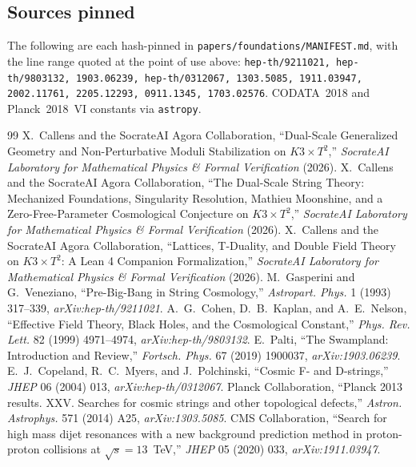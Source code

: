 \documentclass[11pt,a4paper]{article}
\theoremstyle{remark}
\begin{document}
\subsection{Sources pinned}
The following are each hash-pinned in \texttt{papers/foundations/MANIFEST.md}, with the line
range quoted at the point of use above:
{\small\texttt{hep-th/9211021, hep-th/9803132, 1903.06239, hep-th/0312067, 1303.5085,
1911.03947, 2002.11761, 2205.12293, 0911.1345, 1703.02576}}.
CODATA~2018 and Planck~2018~VI constants via \texttt{astropy}.

\begin{thebibliography}{99}
 X.~Callens and the SocrateAI Agora Collaboration, ``Dual-Scale Generalized Geometry and Non-Perturbative Moduli Stabilization on $K3\times T^2$,'' \textit{SocrateAI Laboratory for Mathematical Physics \& Formal Verification} (2026).
 X.~Callens and the SocrateAI Agora Collaboration, ``The Dual-Scale String Theory: Mechanized Foundations, Singularity Resolution, Mathieu Moonshine, and a Zero-Free-Parameter Cosmological Conjecture on $K3\times T^2$,'' \textit{SocrateAI Laboratory for Mathematical Physics \& Formal Verification} (2026).
 X.~Callens and the SocrateAI Agora Collaboration, ``Lattices, T-Duality, and Double Field Theory on $K3\times T^2$: A Lean 4 Companion Formalization,'' \textit{SocrateAI Laboratory for Mathematical Physics \& Formal Verification} (2026).
 M.~Gasperini and G.~Veneziano, ``Pre-Big-Bang in String Cosmology,'' \textit{Astropart. Phys.} 1 (1993) 317--339, \textit{arXiv:hep-th/9211021}.
 A.~G.~Cohen, D.~B.~Kaplan, and A.~E.~Nelson, ``Effective Field Theory, Black Holes, and the Cosmological Constant,'' \textit{Phys. Rev. Lett.} 82 (1999) 4971--4974, \textit{arXiv:hep-th/9803132}.
 E.~Palti, ``The Swampland: Introduction and Review,'' \textit{Fortsch. Phys.} 67 (2019) 1900037, \textit{arXiv:1903.06239}.
 E.~J.~Copeland, R.~C.~Myers, and J.~Polchinski, ``Cosmic F- and D-strings,'' \textit{JHEP} 06 (2004) 013, \textit{arXiv:hep-th/0312067}.
 Planck Collaboration, ``Planck 2013 results. XXV. Searches for cosmic strings and other topological defects,'' \textit{Astron. Astrophys.} 571 (2014) A25, \textit{arXiv:1303.5085}.
 CMS Collaboration, ``Search for high mass dijet resonances with a new background prediction method in proton-proton collisions at $\sqrt{s}=13$~TeV,'' \textit{JHEP} 05 (2020) 033, \textit{arXiv:1911.03947}.

\end{thebibliography}
\end{document}
